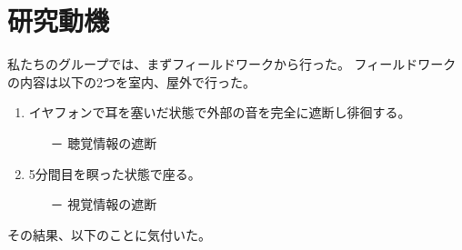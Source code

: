 \documentclass[11pt,a4paper]{report}
\begin{document}
\section{研究動機}
\noindent\space
私たちのグループでは、まずフィールドワークから行った。
フィールドワークの内容は以下の2つを室内、屋外で行った。
\begin{enumerate}
  \item イヤフォンで耳を塞いだ状態で外部の音を完全に遮断し徘徊する。
  \begin{itemize}\item[－] 聴覚情報の遮断\end{itemize}
  \item 5分間目を瞑った状態で座る。
  \begin{itemize}\item[－] 視覚情報の遮断\end{itemize}
\end{enumerate}
その結果、以下のことに気付いた。
\end{document}
